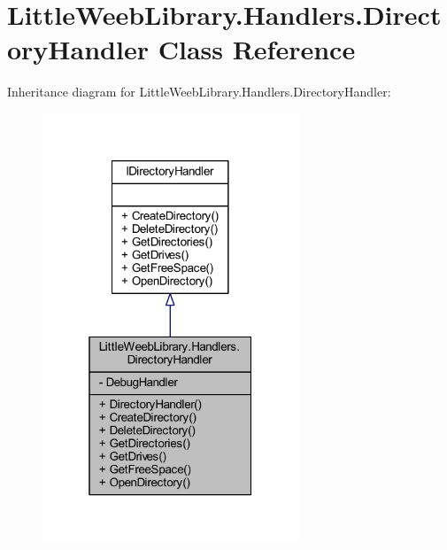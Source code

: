 \hypertarget{class_little_weeb_library_1_1_handlers_1_1_directory_handler}{}\section{Little\+Weeb\+Library.\+Handlers.\+Directory\+Handler Class Reference}
\label{class_little_weeb_library_1_1_handlers_1_1_directory_handler}


Inheritance diagram for Little\+Weeb\+Library.\+Handlers.\+Directory\+Handler\+:\nopagebreak
\begin{figure}[H]
\begin{center}
\leavevmode
\includegraphics[width=217pt]{class_little_weeb_library_1_1_handlers_1_1_directory_handler__inherit__graph}
\end{center}
\end{figure}


